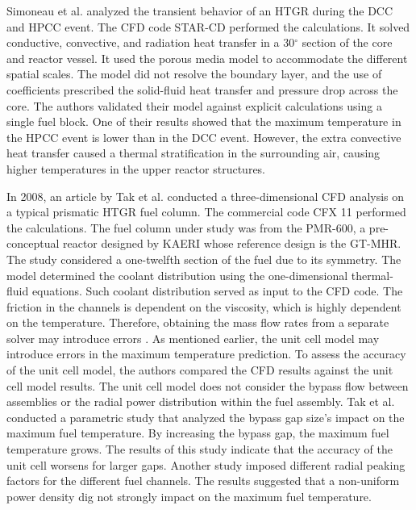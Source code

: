Simoneau et al. \cite{simoneau_three-dimensional_2007} analyzed the transient behavior of an \gls{HTGR} during the \gls{DCC} and \gls{HPCC} event.
The CFD code STAR-CD \cite{computational_dynamics_limited_star-cd_2004} performed the calculations.
It solved conductive, convective, and radiation heat transfer in a 30$^{\circ}$ section of the core and reactor vessel.
It used the porous media model to accommodate the different spatial scales.
The model did not resolve the boundary layer, and the use of coefficients prescribed the solid-fluid heat transfer and pressure drop across the core.
The authors validated their model against explicit calculations using a single fuel block.
One of their results showed that the maximum temperature in the \gls{HPCC} event is lower than in the \gls{DCC} event.
However, the extra convective heat transfer caused a thermal stratification in the surrounding air, causing higher temperatures in the upper reactor structures.

In 2008, an article by Tak et al. \cite{tak_numerical_2008} conducted  a three-dimensional \gls{CFD} analysis on a typical prismatic \gls{HTGR} fuel column.
The commercial code CFX 11 \cite{ansys_incorporated_cfx_2006} performed the calculations.
The fuel column under study was from the PMR-600, a pre-conceptual reactor designed by \gls{KAERI} whose reference design is the GT-MHR.
The study considered a one-twelfth section of the fuel due to its symmetry.
The model determined the coolant distribution using the one-dimensional thermal-fluid equations.
Such coolant distribution served as input to the CFD code.
The friction in the channels is dependent on the viscosity, which is highly dependent on the temperature.
Therefore, obtaining the mass flow rates from a separate solver may introduce errors \cite{sato_computational_2010}.
As mentioned earlier, the unit cell model may introduce errors in the maximum temperature prediction.
To assess the accuracy of the unit cell model, the authors compared the CFD results against the unit cell model results.
The unit cell model does not consider the bypass flow between assemblies or the radial power distribution within the fuel assembly.
Tak et al. conducted a parametric study that analyzed the bypass gap size's impact on the maximum fuel temperature.
By increasing the bypass gap, the maximum fuel temperature grows.
The results of this study indicate that the accuracy of the unit cell worsens for larger gaps.
Another study imposed different radial peaking factors for the different fuel channels.
The results suggested that a non-uniform power density dig not strongly impact on the maximum fuel temperature.

